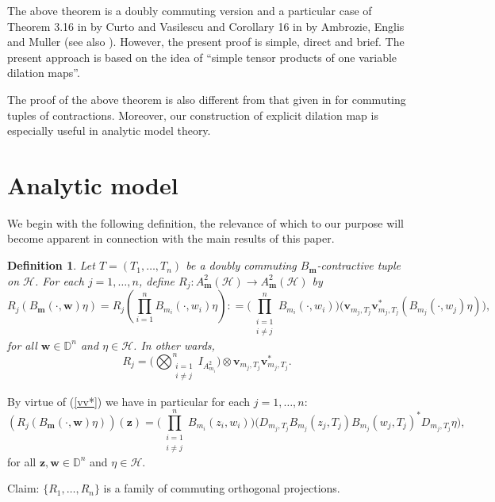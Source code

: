 \documentclass[12pt]{amsart}
\newtheorem{Definition}[Theorem]{\sc Definition}
\begin{document}
The above theorem is a doubly commuting version and a particular
case of Theorem 3.16 in \cite{CV} by Curto and Vasilescu and
Corollary 16 in \cite{AEM} by Ambrozie, Englis and Muller (see also
\cite{BNS}). However, the present proof is simple, direct and brief.
The present approach is based on the idea of ``simple tensor
products of one variable dilation maps''.

The proof of the above theorem is also different from that given in
\cite{BNS} for commuting tuples of contractions.  Moreover, our
construction of explicit dilation map is especially useful in
analytic model theory.

{\setcounter{equation}{0} \section{{Analytic model}}}

We begin with the following definition, the relevance of which to
our purpose will become apparent in connection with the main results
of this paper.

\begin{Definition}\label{R1}
Let $T = (T_1, \ldots, T_n)$ be a doubly commuting
$B_{\bm{m}}$-contractive tuple on ${\mathcal{H}}$. For each $j = 1, \ldots, n$,
define $R_j : A^2_{\bm{m}}({\mathcal{H}}) {\rightarrow} A^2_{\bm{m}}({\mathcal{H}})$ by \[R_j
(B_{\bm{m}}(\cdot, {\bm{w}}) \eta) = R_j(\prod_{i=1}^n B_{m_i}(\cdot, w_i)
\eta) : = \Big(\prod_{\substack{{i=1}\\i \neq j}}^n B_{m_i}(\cdot,
w_i)\Big) \Big( {\bm{v}}_{m_j, T_j} {\bm{v}}_{m_j, T_j}^*(B_{m_j}(\cdot, w_j)
\eta)\Big),\]for all ${\bm{w}} \in {\mathbb{D}}^n$ and $\eta \in {\mathcal{H}}$. In other
wards, \[R_j = \Big(\bigotimes_{\substack{{i=1}\\i \neq j}}^n
I_{A^2_{m_i}}\Big) \otimes {\bm{v}}_{m_j, T_j} {\bm{v}}_{m_j, T_j}^*.\]
\end{Definition}

By virtue of (\ref{vv*}) we have in particular for each $j = 1,
\ldots, n$:
\begin{equation}\label{R-def}(R_j (B_{\bm{m}}(\cdot, {\bm{w}}) \eta))({\bm{z}}) =
\Big(\prod_{\substack{{i=1}\\i \neq j}}^n B_{m_i}(z_i, w_i)\Big)
\Big( D_{m_j, T_j} B_{m_j}(z_j, T_j) B_{m_j}(w_j, T_j)^* D_{m_j,
T_j} \eta \Big),\end{equation}for all ${\bm{z}}, {\bm{w}} \in {\mathbb{D}}^n$ and $\eta
\in {\mathcal{H}}$.

{\noindent}\textsf{Claim:} $\{R_1, \ldots, R_n\}$ is a family of commuting
orthogonal projections.
\end{document}
